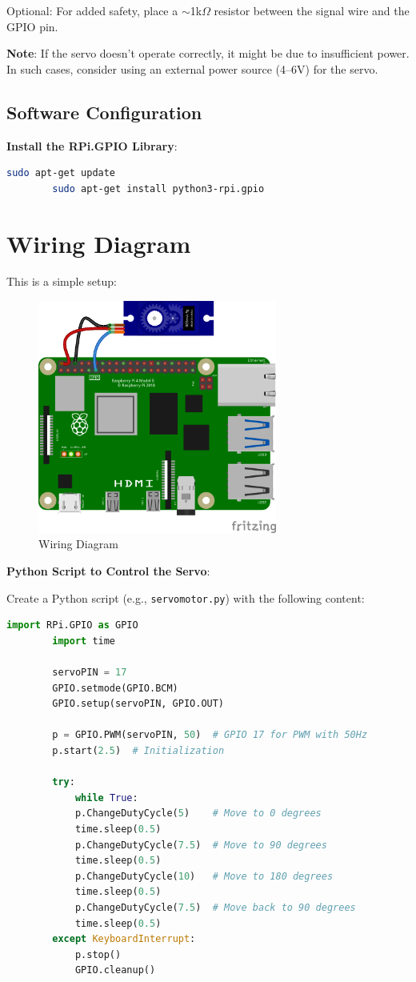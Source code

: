 \documentclass{article}
\begin{document}
	Optional: For added safety, place a $\sim$1k$\Omega$ resistor between the signal wire and the GPIO pin.
	
	\textbf{Note}: If the servo doesn't operate correctly, it might be due to insufficient power. In such cases, consider using an external power source (4--6V) for the servo.
	
	\subsection*{Software Configuration}
	
	\textbf{Install the RPi.GPIO Library}:
	\begin{lstlisting}[language=bash]
		sudo apt-get update
		sudo apt-get install python3-rpi.gpio
	\end{lstlisting}
	
	\section*{Wiring Diagram}
	This is a simple setup:
	
	\begin{figure}[H]
		\centering
		\includegraphics[width=0.7\textwidth]{08a-servo-motors-intro.png} %
		\caption{Wiring Diagram}
	\end{figure}
	
	\newpage
	\textbf{Python Script to Control the Servo}:
	
	Create a Python script (e.g., \texttt{servomotor.py}) with the following content:
	
	\begin{lstlisting}[language=python]
		import RPi.GPIO as GPIO
		import time
		
		servoPIN = 17
		GPIO.setmode(GPIO.BCM)
		GPIO.setup(servoPIN, GPIO.OUT)
		
		p = GPIO.PWM(servoPIN, 50)  # GPIO 17 for PWM with 50Hz
		p.start(2.5)  # Initialization
		
		try:
			while True:
			p.ChangeDutyCycle(5)    # Move to 0 degrees
			time.sleep(0.5)
			p.ChangeDutyCycle(7.5)  # Move to 90 degrees
			time.sleep(0.5)
			p.ChangeDutyCycle(10)   # Move to 180 degrees
			time.sleep(0.5)
			p.ChangeDutyCycle(7.5)  # Move back to 90 degrees
			time.sleep(0.5)
		except KeyboardInterrupt:
			p.stop()
			GPIO.cleanup()
	\end{lstlisting}
	
\end{document}

